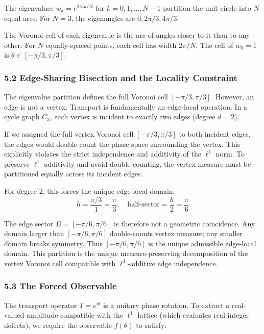 \documentclass[
]{article}
\begin{document}
The eigenvalues \(w_k = e^{2\pi i k / N}\) for \(k = 0, 1, \ldots, N-1\)
partition the unit circle into \(N\) equal arcs. For \(N = 3\), the
eigenangles are \(0, 2\pi/3, 4\pi/3\).

The Voronoi cell of each eigenvalue is the arc of angles closer to it
than to any other. For \(N\) equally-spaced points, each cell has width
\(2\pi/N\). The cell of \(w_0 = 1\) is \(\theta \in [-\pi/3, \pi/3]\).

\hypertarget{edge-sharing-bisection-and-the-locality-constraint}{%
\subsubsection{5.2 Edge-Sharing Bisection and the Locality
Constraint}\label{edge-sharing-bisection-and-the-locality-constraint}}

The eigenvalue partition defines the full Voronoi cell
\([-\pi/3, \pi/3]\). However, an edge is not a vertex. Transport is
fundamentally an edge-local operation. In a cycle graph \(C_3\), each
vertex is incident to exactly two edges (degree \(d = 2\)).

If we assigned the full vertex Voronoi cell \([-\pi/3, \pi/3]\) to both
incident edges, the edges would double-count the phase space surrounding
the vertex. This explicitly violates the strict independence and
additivity of the \(\ell^1\) norm. To preserve \(\ell^1\) additivity and
avoid double counting, the vertex measure must be partitioned equally
across its incident edges.

For degree 2, this forces the unique edge-local domain:
\[h = \frac{\pi/3}{1} = \frac{\pi}{3}, \quad \text{half-sector} = \frac{h}{2} = \frac{\pi}{6}\]

The edge sector \(\Omega = [-\pi/6, \pi/6]\) is therefore not a
geometric coincidence. Any domain larger than \([-\pi/6, \pi/6]\)
double-counts vertex measure; any smaller domain breaks symmetry. Thus
\([-\pi/6, \pi/6]\) is the unique admissible edge-local domain. This
partition is the unique measure-preserving decomposition of the vertex
Voronoi cell compatible with \(\ell^1\)-additive edge independence.

\hypertarget{the-forced-observable}{%
\subsubsection{5.3 The Forced Observable}\label{the-forced-observable}}

The transport operator \(T = e^{i\theta}\) is a unitary phase rotation.
To extract a real-valued amplitude compatible with the \(\ell^1\)
lattice (which evaluates real integer defects), we require the
observable \(f(\theta)\) to satisfy:
\end{document}
